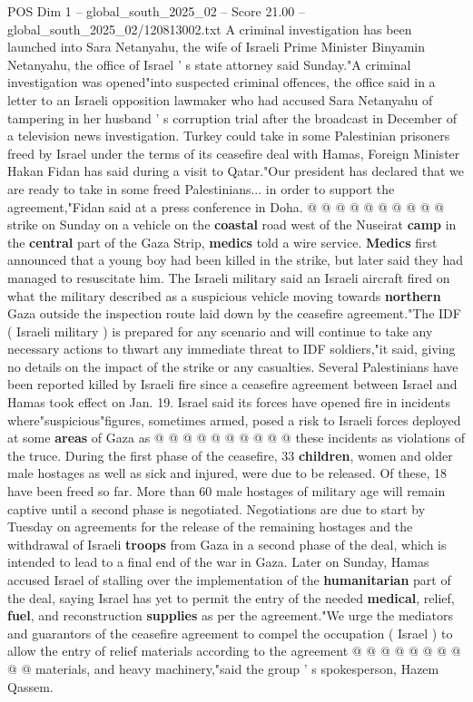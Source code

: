 \begin{textsample}{POS Dim 1 – global\_south\_2025\_02 – Score 21.00 – global\_south\_2025\_02/120813002.txt}
A criminal investigation has been launched into Sara Netanyahu, the wife of Israeli Prime Minister Binyamin Netanyahu, the office of Israel ' s state attorney said Sunday."A criminal investigation was opened"into suspected criminal offences, the office said in a letter to an Israeli opposition lawmaker who had accused Sara Netanyahu of tampering in her husband ' s corruption trial after the broadcast in December of a television news investigation.
Turkey could take in some Palestinian prisoners freed by Israel under the terms of its ceasefire deal with Hamas, Foreign Minister Hakan Fidan has said during a visit to Qatar."Our president has declared that we are ready to take in some freed Palestinians... in order to support the agreement,"Fidan said at a press conference in Doha. @ @ @ @ @ @ @ @ @ @ strike on Sunday on a vehicle on the \textbf{coastal} road west of the Nuseirat \textbf{camp} in the \textbf{central} part of the Gaza Strip, \textbf{medics} told a wire service. \textbf{Medics} first announced that a young boy had been killed in the strike, but later said they had managed to resuscitate him.
The Israeli military said an Israeli aircraft fired on what the military described as a suspicious vehicle moving towards \textbf{northern} Gaza outside the inspection route laid down by the ceasefire agreement."The IDF ( Israeli military ) is prepared for any scenario and will continue to take any necessary actions to thwart any immediate threat to IDF soldiers,"it said, giving no details on the impact of the strike or any casualties.
Several Palestinians have been reported killed by Israeli fire since a ceasefire agreement between Israel and Hamas took effect on Jan. 19.
Israel said its forces have opened fire in incidents where"suspicious"figures, sometimes armed, posed a risk to Israeli forces deployed at some \textbf{areas} of Gaza as @ @ @ @ @ @ @ @ @ @ these incidents as violations of the truce.
During the first phase of the ceasefire, 33 \textbf{children}, women and older male hostages as well as sick and injured, were due to be released.
Of these, 18 have been freed so far.
More than 60 male hostages of military age will remain captive until a second phase is negotiated.
Negotiations are due to start by Tuesday on agreements for the release of the remaining hostages and the withdrawal of Israeli \textbf{troops} from Gaza in a second phase of the deal, which is intended to lead to a final end of the war in Gaza.
Later on Sunday, Hamas accused Israel of stalling over the implementation of the \textbf{humanitarian} part of the deal, saying Israel has yet to permit the entry of the needed \textbf{medical}, relief, \textbf{fuel}, and reconstruction \textbf{supplies} as per the agreement."We urge the mediators and guarantors of the ceasefire agreement to compel the occupation ( Israel ) to allow the entry of relief materials according to the agreement @ @ @ @ @ @ @ @ @ @ materials, and heavy machinery,"said the group ' s spokesperson, Hazem Qassem.

\end{textsample}

